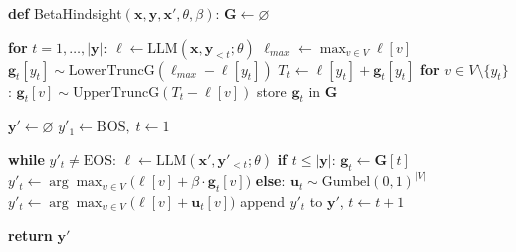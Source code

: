 \begin{algorithm}[t]
\caption{$\beta$-Hindsight Control}
\label{alg:gumbel-cf-short}
\begin{algorithmic}[1]

\STATE \textbf{def} BetaHindsight$(\mathbf x, \mathbf y, \mathbf x', \theta, \beta)$:
\STATE \quad $\mathbf G \gets \varnothing$

\STATE \quad \textbf{for} $t = 1,\dots,|\mathbf y|$: 
\STATE \qquad $\ell \gets \mathrm{LLM}(\mathbf x, \mathbf y_{<t};\theta)$
\STATE \qquad $\ell_{max} \gets \max_{v\in V} \ell[v]$
\STATE \qquad $\mathbf g_t[y_t] \sim \mathrm{LowerTruncG}(\ell_{max} - \ell[y_t])$
\STATE \qquad $T_t \gets \ell[y_t] + \mathbf g_t[y_t]$
\STATE \qquad \textbf{for} $v \in V \setminus \{y_t\}$:
\STATE \qquad\quad $\mathbf g_t[v] \sim \mathrm{UpperTruncG}(T_t - \ell[v])$
\STATE \qquad store $\mathbf g_t$ in $\mathbf G$

\STATE \quad $\mathbf y' \gets \varnothing$
\STATE \quad $y'_1 \gets \mathrm{BOS},\; t \gets 1$

\STATE \quad \textbf{while} $y'_t \neq \mathrm{EOS}$: 
\STATE \qquad $\ell \gets \mathrm{LLM}(\mathbf x', \mathbf y'_{<t}; \theta)$
\STATE \qquad \textbf{if} $t \le |\mathbf y|$:
\STATE \qquad\quad $\mathbf g_t \gets \mathbf G[t]$
\STATE \qquad\quad $y'_t \gets \arg\max_{v\in V}\bigl(\ell[v] + \beta \cdot \mathbf g_t[v]\bigr)$
\STATE \qquad \textbf{else}:
\STATE \qquad\quad $\mathbf u_t \sim \mathrm{Gumbel}(0,1)^{|V|}$
\STATE \qquad\quad $y'_t \gets \arg\max_{v\in V}\bigl(\ell[v] + \mathbf u_t[v]\bigr)$
\STATE \qquad append $y'_t$ to $\mathbf y'$, $t \gets t+1$

\STATE \quad \textbf{return} $\mathbf y'$

\end{algorithmic}
\end{algorithm}